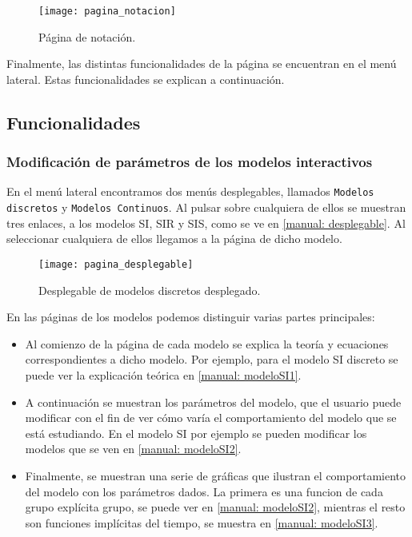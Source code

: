 \begin{figure}
\begin{center}
\caption{Página de notación.}
\label{manual: notacion}
\texttt{[image: pagina\_notacion]}
\end{center}
\end{figure}

Finalmente, las distintas funcionalidades de la página se encuentran en el menú lateral. Estas funcionalidades se explican a continuación.

\subsection{Funcionalidades}

\subsubsection{Modificación de parámetros de los modelos interactivos}

En el menú lateral encontramos dos menús desplegables, llamados \verb|Modelos discretos| y \verb|Modelos Continuos|. Al pulsar sobre cualquiera de ellos se muestran tres enlaces, a los modelos SI, SIR y SIS, como se ve en \eqref{manual: desplegable}. Al seleccionar cualquiera de ellos llegamos a la página de dicho modelo.

\begin{figure}
\begin{center}
\caption{Desplegable de modelos discretos desplegado.}
\label{manual: desplegable}
\texttt{[image: pagina\_desplegable]}
\end{center}
\end{figure}

En las páginas de los modelos podemos distinguir varias partes principales:

\begin{itemize}
\item Al comienzo de la página de cada modelo se explica la teoría y ecuaciones correspondientes a dicho modelo. Por ejemplo, para el modelo SI discreto se puede ver la explicación teórica en \eqref{manual: modeloSI1}.
\item A continuación se muestran los parámetros del modelo, que el usuario puede modificar con el fin de ver cómo varía el comportamiento del modelo que se está estudiando. En el modelo SI por ejemplo se pueden modificar los modelos que se ven en \eqref{manual: modeloSI2}.
\item Finalmente, se muestran una serie de gráficas que ilustran el comportamiento del modelo con los parámetros dados. La primera es una funcion de cada grupo explícita grupo, se puede ver en \eqref{manual: modeloSI2}, mientras el resto son funciones implícitas del tiempo, se muestra en \eqref{manual: modeloSI3}.
\end{itemize}


